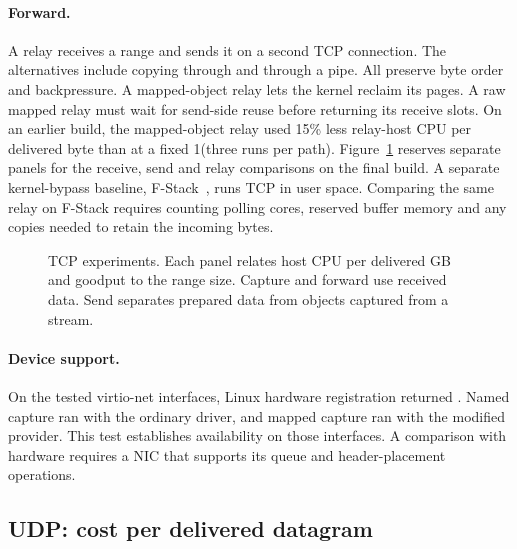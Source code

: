 \paragraph{Forward.} A relay receives a range and sends it on a second TCP
connection. The alternatives include copying through \iouring and \splice
through a pipe. All preserve byte order and backpressure. A mapped-object relay
lets the kernel reclaim its pages. A raw mapped relay must wait for send-side
reuse before returning its receive slots. On an earlier build, the mapped-object
relay used 15\% less relay-host CPU per delivered byte than \splice at a fixed
1\GBs (three runs per path). Figure~\ref{fig:tcp} reserves separate panels for
the receive, send and relay comparisons on the final build.
A separate kernel-bypass baseline, F-Stack~\cite{fstack}, runs TCP in user
space. Comparing the same relay on F-Stack requires counting polling cores,
reserved buffer memory and any copies needed to retain the incoming bytes.

\begin{figure}[t]
\centering
\hfill
\hfill

\caption{TCP experiments. Each panel relates host CPU per delivered GB and
goodput to the range size. Capture and forward use received data. Send separates
prepared data from objects captured from a stream.}
\label{fig:tcp}
\end{figure}

\paragraph{Device support.} On the tested virtio-net interfaces, Linux hardware
\recvzc registration returned . Named capture ran with the
ordinary driver, and mapped capture ran with the modified provider. This test
establishes availability on those interfaces. A comparison with hardware
\recvzc requires a NIC that supports its queue and header-placement operations.

\subsection{UDP: cost per delivered datagram}
\label{sec:eval:udp}

